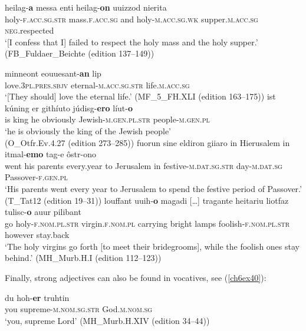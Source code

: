 \documentclass[output=paper,colorlinks,citecolor=brown]{langscibook}
\begin{document}
\begin{exe}
\ex\label{ch6ex38}
\gll heilag-\textbf{a} messa enti heilag-\textbf{on} uuizzod nierita\\
 holy-\textsc{f.acc.sg.str} mass.\textsc{f.acc.sg} and holy-\textsc{m.acc.sg.wk} supper.\textsc{m.acc.sg} \textsc{neg}.respected\\
\glt `{[}I confess that I{]} failed to respect the holy mass and the holy supper.'\\(FB\_Fuldaer\_Beichte (edition 137--149))
\end{exe}

\begin{exe}
\ex\label{ch6ex39}\begin{xlist}
\ex\label{ch6ex39a}
\gll  minneont eouuesant-\textbf{an} lip\\
love.\textsc{3pl.pres.sbjv} eternal-\textsc{m.acc.sg.str} life.\textsc{m.acc.sg}\\
\glt `{[}They should{]} love the eternal life.' (MF\_5\_FH.XLI (edition 163--175))
\ex\label{ch6ex39b} 
\gll ist kúning er githíuto júdisg-\textbf{ero} líut-\textbf{o}\\
is king he obviously Jewish-\textsc{m.gen.pl.str} people-\textsc{m.gen.pl}\\
\glt `he is obviously the king of the Jewish people'\\(O\_Otfr.Ev.4.27 (edition 273--285))
\ex\label{ch6ex39c} 
\gll fuorun sine eldiron giiaro in Hierusalem in itmal-\textbf{emo} tag-e ôstr-ono\\
went his parents every.year to Jerusalem in festive-\textsc{m.dat.sg.str} day-\textsc{m.dat.sg} Passover-\textsc{f.gen.pl}\\
\glt `His parents went every year to Jerusalem to spend the festive period of
Passover.' (T\_Tat12 (edition 19--31))
\ex\label{ch6ex39d} 
\gll louffant uuih-\textbf{o} magadi {[}\ldots{]} tragante heitariu liotfaz tulisc-\textbf{o} auur pilibant  \\
go holy-\textsc{f.nom.pl.str} virgin.\textsc{f.nom.pl} {} carrying bright lamps foolish-\textsc{f.nom.pl.str} however stay.back\\
\glt `The holy virgins go forth {[}to meet their bridegrooms{]}, while the
foolish ones stay behind.' (MH\_Murb.H.I (edition 112--123))
\end{xlist}
\end{exe}

Finally, strong adjectives can also be found in vocatives, see (\ref{ch6ex40}):

\begin{exe}
\ex\label{ch6ex40}
\gll du hoh-\textbf{er} truhtin\\
you supreme-\textsc{m.nom.sg.str} God.\textsc{m.nom.sg}\\
\glt `you, supreme Lord' (MH\_Murb.H.XIV (edition 34--44))
\end{exe}
\end{document}
